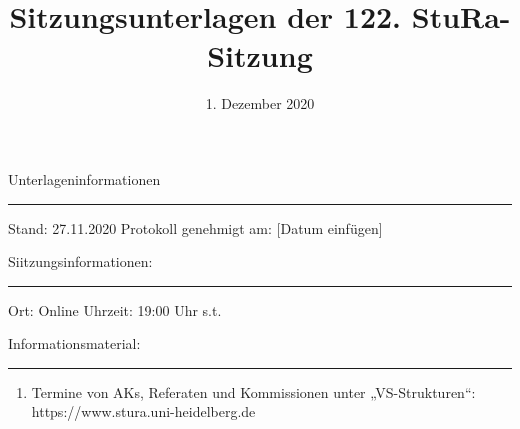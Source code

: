 \title{Sitzungsunterlagen der 122. StuRa-Sitzung}
\date{\vspace{-2em}1. Dezember 2020\vspace{-1em}} %
\maketitle

Unterlageninformationen
\hrule
Stand: 27.11.2020
Protokoll genehmigt am: [Datum einfügen]

Siitzungsinformationen:
\hrule
Ort: Online
Uhrzeit: 19:00 Uhr s.t.

Informationsmaterial:
\hrule
\begin{enumerate}
    \item Termine   von   AKs,   Referaten   und   Kommissionen   unter   „VS-Strukturen“: https://www.stura.uni-heidelberg.de
\end{enumerate}
